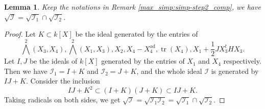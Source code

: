 \documentclass[pdflatex,sn-mathphys-num]{sn-jnl}%
\theoremstyle{thmstyleone}%
\newtheorem{lemma}[subsubsection]{Lemma}%
\theoremstyle{thmstyletwo}%
\numberwithin{equation}{subsection}
\theoremstyle{thmstylethree}%
\newcommand{\CI}{\ensuremath{\mathcal{I}}\xspace}
\newcommand{\ad}{\mathrm{ad}}
\DeclareMathOperator{\tr}{tr}
\begin{document}
\begin{lemma}\label{max_simp:simp-step2_comp-radical}
Keep the notations in Remark \ref{max_simp:simp-step2_comp}, we have $\sqrt{\CI}=\sqrt{\CI_1}\cap\sqrt{\CI_2}$.
\end{lemma}
\begin{proof}
Let $K\subset k[X]$ be the ideal generated by the entries of 
\begin{equation*}
	\bigwedge^2 (X_3,X_4), \bigwedge^2(X_1,X_3), X_2, X_4-X_4^{\ad}, \tr(X_4), X_1+\frac{1}{2}JX_3^t HX_3.
\end{equation*}
Let $I, J$ be the ideals of $k[X]$ generated by the entries of $X_1$ and $X_4$ respectively. 
Then we have $\CI_1=I+K$ and $\CI_2=J+K$, and the whole ideal $\CI$ is generated by $IJ+K$.
Consider the inclusion
\begin{equation*}
    IJ+K^2\subset (I+K)(J+K)\subset IJ+K.
\end{equation*}
Taking radicals on both sides, we get $\sqrt{\CI}=\sqrt{\CI_1\CI_2}=\sqrt{\CI_1}\cap\sqrt{\CI_2}$.
\end{proof}
\end{document}
